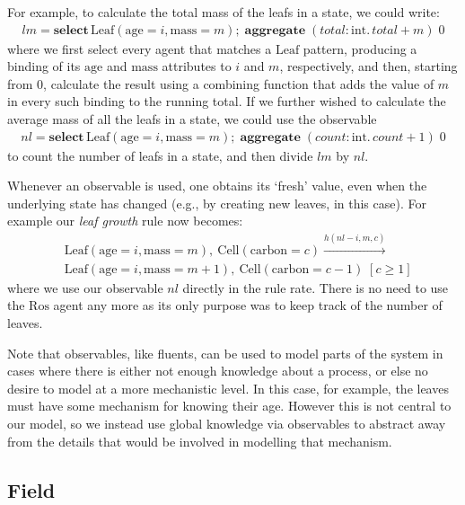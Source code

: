 \documentclass[phd]{infthesis}
\newcommand{\eg}{e.g.\xspace}
\begin{document}
 For example, to calculate the total mass  of the leafs in a state, we could write:
 \begin{align*}
lm = \mathbf{select} \, \mathrm{Leaf}(\mathrm{age} = i, \mathrm{mass} = m) \mathbf{;} \; \mathbf{aggregate} \;
 (total: \mathrm{int}.\, total + m) \; 0
\end{align*}
%
where we first select every agent that matches a $\mathrm{Leaf}$ pattern,
producing a binding of its $\mathrm{age}$ and $\mathrm{mass}$ attributes to $i$
and $m$, respectively, and then, starting from $0$, calculate the result using a
combining function that adds the value of $m$ in every such binding to the
running total.
If we further wished to calculate the average mass of all the leafs in a state,
we could use the observable
\begin{align*}
nl = \mathbf{select} \, \mathrm{Leaf}(\mathrm{age} = i, \mathrm{mass} = m) \mathbf{;} \; \mathbf{aggregate} \;
 (count: \mathrm{int}.\, count + 1) \; 0
\end{align*}
%
to count the number of leafs in a state, and then divide $lm$ by $nl$.

Whenever an observable is used, one obtains its `fresh' value, even when the
underlying state has changed (\eg, by creating new leaves, in this case). For
example our \textit{leaf growth} rule now becomes:
%
\begin{align*}
&\mathrm{Leaf}(\mathrm{age} \!= \!i, \mathrm{mass} \!= \!m),\:
  \mathrm{Cell}(\mathrm{carbon} \!= \!c) \xrightarrow{h(nl-i, m, c)}\:   \\
  &
 \mathrm{Leaf}(\mathrm{age} \!= \!i, \mathrm{mass} \!= \!m+1),\:
    \mathrm{Cell}(\mathrm{carbon} \!= \!c-1) \; [c \geq  1]
\end{align*}
where we use our observable $nl$ directly in the rule rate. There is no need to
use the $\mathrm{Ros}$ agent any more as its only purpose was to keep track of
the number of leaves.

Note that observables, like fluents, can be used to model parts of the system in
cases where there is either not enough knowledge about a process, or else no
desire to model at a more mechanistic level. In this case, for example, the
leaves must have some mechanism for knowing their age. However this is not
central to our model, so we instead use global knowledge via observables to
abstract away from the details that would be involved in modelling that
mechanism.

\subsection{Field}
\end{document}
